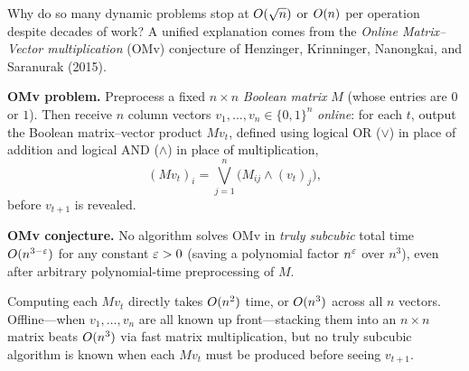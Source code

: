 Why do so many dynamic problems stop at $O(\sqrt n)$ or $O(n)$ per operation despite
decades of work? A unified explanation comes from the \emph{Online Matrix--Vector
multiplication} (OMv) conjecture of Henzinger, Krinninger, Nanongkai, and Saranurak
(2015).

\begin{focusbox}
\textbf{OMv problem.} Preprocess a fixed $n\times n$ \emph{Boolean matrix} $M$ (whose
entries are $0$ or $1$). Then receive $n$ column vectors $v_1,\dots,v_n\in\{0,1\}^n$
\emph{online}: for each $t$, output the Boolean matrix--vector product $Mv_t$, defined
using logical OR ($\vee$) in place of addition and logical AND ($\wedge$) in place of
multiplication,
\[
  (Mv_t)_i = \bigvee_{j=1}^{n} \bigl(M_{ij} \wedge (v_t)_j\bigr),
\]
before $v_{t+1}$ is revealed.

\textbf{OMv conjecture.} No algorithm solves OMv in \emph{truly subcubic} total time
$O(n^{3-\varepsilon})$ for any constant $\varepsilon>0$ (saving a polynomial factor $n^\varepsilon$ over
$n^3$), even after arbitrary polynomial-time preprocessing of $M$.
\end{focusbox}

Computing each $Mv_t$ directly takes $O(n^2)$ time, or $O(n^3)$ across all $n$
vectors. Offline---when $v_1,\dots,v_n$ are all known up front---stacking them into an
$n\times n$ matrix beats $O(n^3)$ via fast matrix multiplication, but no truly
subcubic algorithm is known when each $Mv_t$ must be produced before seeing $v_{t+1}$.

